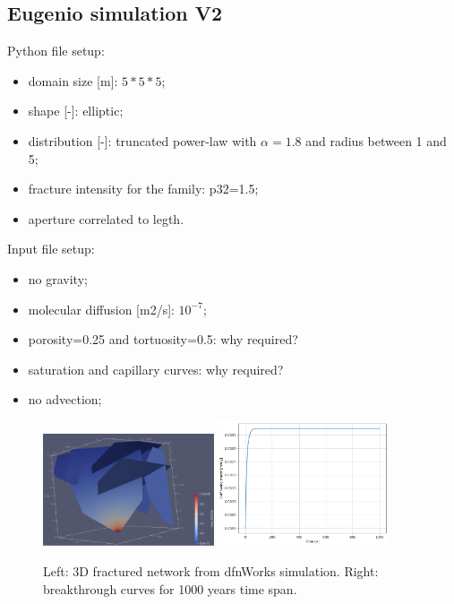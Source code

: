 \documentclass{article}
\begin{document}
\subsection{Eugenio simulation V2}
Python file setup:
\begin{itemize}
    \item domain size [m]: $5*5*5$;
    \item shape [-]: elliptic;
    \item distribution [-]: truncated power-law with $\alpha=1.8$ and radius between 1 and 5;
    \item fracture intensity for the family: p32=1.5;
    \item aperture correlated to legth.
\end{itemize}
Input file setup:
\begin{itemize}
    \item no gravity;
    \item molecular diffusion [m2/s]: $10^{-7}$;
    \item porosity=0.25 and tortuosity=0.5: why required?
    \item saturation and capillary curves: why required?
    \item no advection;
\end{itemize}
\begin{figure}[htbp!]
    \centering
    \includegraphics[width=0.45\textwidth]{images/dfnWorksImages/3DdfnDiffEug.png}
    \hspace{0.05\textwidth}
    \includegraphics[width=0.45\textwidth]{images/dfnWorksImages/btcFrom3Deug.png}
    \caption{Left: 3D fractured network from dfnWorks simulation. Right: breakthrough curves for 1000 years time span.}
    \label{fig:3DdfnWorksEug}
\end{figure}
\FloatBarrier  %
\end{document}
